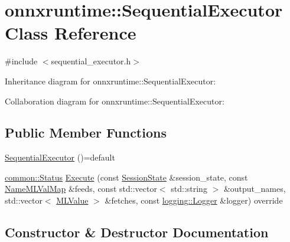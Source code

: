 \hypertarget{classonnxruntime_1_1SequentialExecutor}{}\section{onnxruntime\+:\+:Sequential\+Executor Class Reference}
\label{classonnxruntime_1_1SequentialExecutor}


{\ttfamily \#include $<$sequential\+\_\+executor.\+h$>$}



Inheritance diagram for onnxruntime\+:\+:Sequential\+Executor\+:


Collaboration diagram for onnxruntime\+:\+:Sequential\+Executor\+:
\subsection*{Public Member Functions}
\begin{DoxyCompactItemize}
\item 
\mbox{\hyperlink{classonnxruntime_1_1SequentialExecutor_ad78638739bd7ca7c8fedc469ef7529ce}{Sequential\+Executor}} ()=default
\item 
\mbox{\hyperlink{classonnxruntime_1_1common_1_1Status}{common\+::\+Status}} \mbox{\hyperlink{classonnxruntime_1_1SequentialExecutor_ade54efc80e70d9e2d1d5024abe40a60c}{Execute}} (const \mbox{\hyperlink{classonnxruntime_1_1SessionState}{Session\+State}} \&session\+\_\+state, const \mbox{\hyperlink{namespaceonnxruntime_a48b01f0410ec8d693dbd40d1132bd66c}{Name\+M\+L\+Val\+Map}} \&feeds, const std\+::vector$<$ std\+::string $>$ \&output\+\_\+names, std\+::vector$<$ \mbox{\hyperlink{classonnxruntime_1_1MLValue}{M\+L\+Value}} $>$ \&fetches, const \mbox{\hyperlink{classonnxruntime_1_1logging_1_1Logger}{logging\+::\+Logger}} \&logger) override
\end{DoxyCompactItemize}


\subsection{Constructor \& Destructor Documentation}
\mbox{\label{classonnxruntime_1_1SequentialExecutor_ad78638739bd7ca7c8fedc469ef7529ce}} 
